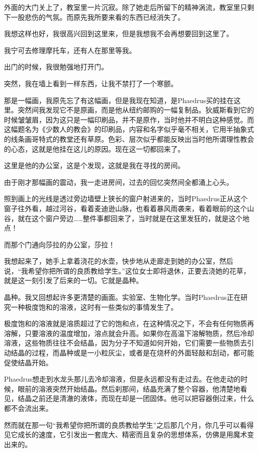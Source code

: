 \documentclass[UTF8]{article}
\begin{document}
\par 外面的大门关上了，教室里一片沉寂。除了她走后所留下的精神涡流，教室里只剩下一股悲伤的气氛。而原先我所要来看的东西已经消失了。
\par 我想这样也好，我很高兴回到这里来，但是我想我不会再想要回到这里了。
\par 我宁可去修理摩托车，还有人在那里等我。
\par 出门的时候，我很勉强地打开门。
\par 突然，我在墙上看到一样东西，让我不禁打了一个寒颤。
\par 那是一幅画，我原先忘了有这幅画，但是我现在知道，是Phaedrus买的挂在这里。突然间我发现它不是原画，而是他从纽约邮购的一幅复制品。狄威斯看到它的时候皱皱眉，因为这只是一幅印刷品，并不是原作，当时他并不明白这种感觉。而这幅题名为《少数人的教会》的印刷品，内容和名字似乎毫不相关，它用半抽象式的线条画哥特式的教堂还有草原。色彩、层次似乎都能反映出当时他所谓理性教会的心态，这就是他挂在这儿的原因。现在这一切都回来了。
\par 这里是他的办公室，这是个发现，这就是我在寻找的房间。
\par 由于刚才那幅画的震动，我一走进房间，过去的回忆突然间全都涌上心头。
\par 照到画上的光线是透过旁边墙壁上狭长的窗户射进来的，当时Phaedrus正从这个窗子往外看，越过河谷，看着麦迪逊山脉，也看着暴风雨袭来，看着眼前的这个山谷，就在这个窗户旁边……整件事都回来了，当时就是在这里发狂的，就是这个地点！
\par 而那个门通向莎拉的办公室，莎拉！
\par 我想起来了，她手上拿着浇花的水壶，快步地从走廊走到她的办公室，然后说，“我希望你把所谓的良质教给学生。”这位女士即将退休，正要去浇她的花草，就是这一刻引发了后来的一切。它就是晶种。
\par 晶种。我又回想起许多更清楚的画面。实验室、生物化学。当时Phaedrus正在研究一种极度饱和的溶液，这时有一些类似的事情发生了。
\par 极度饱和的溶液就是溶质超过了它的饱和点，在这种情况之下，不会有任何物质再溶解，只要溶液的温度增加，溶点就会升高。如果你在高温下溶解物质，然后冷却溶液，这些物质往往不会结晶，因为分子不知道如何开始，它们需要一些物质去引动结晶的过程，而晶种或是一小粒灰尘，或者是在烧杯的外面轻敲和刮动，都可能促使结晶开始。
\par Phaedrus想走到水龙头那儿去冷却溶液，但是永远都没有走过去。在他走动的时候，眼前的溶液突然开始结晶。然后刹那间，结晶充满了整个容器，他清楚地看见，结晶之前还是清澈的液体，而现在却是一团固体。他可以把容器倒过来，什么都不会流出来。
\par 然而就在那一句“我希望你把所谓的良质教给学生”之后那几个月，你几乎可以看得见它成长的速度，它引发出一套庞大、精密而且复杂的思想体系，仿佛是用魔术变出来的。
\end{document}
